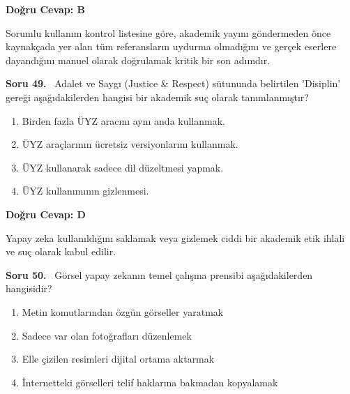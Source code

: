 \documentclass[11pt,a4paper,openany]{book}
\begin{document}
\vspace{4pt}
\begin{tcolorbox}[title=Cevap ve Açıklama, colback=gray!3!white, colframe=primarycolor!90!black, arc=2mm, fonttitle=\bfseries\sffamily, top=6pt, bottom=6pt]
    \textbf{Doğru Cevap: B}

    \vspace{2pt}
    Sorumlu kullanım kontrol listesine göre, akademik yayını göndermeden önce kaynakçada yer alan tüm referansların uydurma olmadığını ve gerçek eserlere dayandığını manuel olarak doğrulamak kritik bir son adımdır.
\end{tcolorbox}
\vspace{10pt}
\needspace{5cm}
\vspace{8pt}
\noindent\textbf{\large\sffamily Soru 49.} \ Adalet ve Saygı (Justice \& Respect) sütununda belirtilen 'Disiplin' gereği aşağıdakilerden hangisi bir akademik suç olarak tanımlanmıştır?

\begin{enumerate}[label=\Alph*), leftmargin=25pt, topsep=4pt, itemsep=2pt]
        \item Birden fazla ÜYZ aracını aynı anda kullanmak.
        \item ÜYZ araçlarının ücretsiz versiyonlarını kullanmak.
        \item ÜYZ kullanarak sadece dil düzeltmesi yapmak.
        \item ÜYZ kullanımının gizlenmesi.
\end{enumerate}

\vspace{4pt}
\begin{tcolorbox}[title=Cevap ve Açıklama, colback=gray!3!white, colframe=primarycolor!90!black, arc=2mm, fonttitle=\bfseries\sffamily, top=6pt, bottom=6pt]
    \textbf{Doğru Cevap: D}

    \vspace{2pt}
    Yapay zeka kullanıldığını saklamak veya gizlemek ciddi bir akademik etik ihlali ve suç olarak kabul edilir.
\end{tcolorbox}
\vspace{10pt}
\needspace{5cm}
\vspace{8pt}
\noindent\textbf{\large\sffamily Soru 50.} \ Görsel yapay zekanın temel çalışma prensibi aşağıdakilerden hangisidir?

\begin{enumerate}[label=\Alph*), leftmargin=25pt, topsep=4pt, itemsep=2pt]
        \item Metin komutlarından özgün görseller yaratmak
        \item Sadece var olan fotoğrafları düzenlemek
        \item Elle çizilen resimleri dijital ortama aktarmak
        \item İnternetteki görselleri telif haklarına bakmadan kopyalamak
\end{enumerate}
\end{document}
